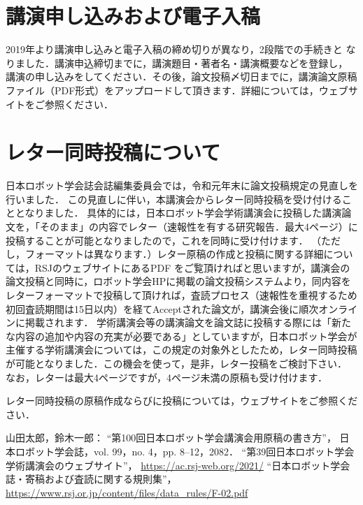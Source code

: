 \section{講演申し込みおよび電子入稿}
2019年より講演申し込みと電子入稿の締め切りが異なり，2段階での手続きと
なりました．講演申込締切までに，講演題目・著者名・講演概要などを登録し，
講演の申し込みをしてください．その後，論文投稿〆切日までに，講演論文原稿ファイル（PDF形式）をアップロードして頂きます．詳細については，ウェブサイトをご参照ください．

\section{レター同時投稿について}

日本ロボット学会誌会誌編集委員会では，令和元年末に論文投稿規定の見直しを行いました．
この見直しに伴い，本講演会からレター同時投稿を受け付けることとなりました．
具体的には，日本ロボット学会学術講演会に投稿した講演論文を，「そのまま」の内容でレター（速報性を有する研究報告．最大4ページ）に投稿することが可能となりましたので，これを同時に受け付けます．
（ただし，フォーマットは異なります．）レター原稿の作成と投稿に関する詳細については，RSJのウェブサイトにあるPDF\cite{rsj_rules}
をご覧頂ければと思いますが，講演会の論文投稿と同時に，ロボット学会HPに掲載の論文投稿システムより，同内容をレターフォーマットで投稿して頂ければ，査読プロセス（速報性を重視するため初回査読期間は15日以内）を経てAcceptされた論文が，講演会後に順次オンラインに掲載されます．
学術講演会等の講演論文を論文誌に投稿する際には「新たな内容の追加や内容の充実が必要である」としていますが，日本ロボット学会が主催する学術講演会については，この規定の対象外としたため，レター同時投稿が可能となりました．この機会を使って，是非，レター投稿をご検討下さい． なお，レターは最大4ページですが，4ページ未満の原稿も受け付けます． 

レター同時投稿の原稿作成ならびに投稿については，ウェブサイト\cite{website}をご参照ください．

    
\small
\begin{thebibliography}{9}

山田太郎，鈴木一郎：
``第100回日本ロボット学会講演会用原稿の書き方''，
日本ロボット学会誌，vol. 99，no. 4，pp. 8--12，2082．
``第39回日本ロボット学会学術講演会のウェブサイト''，
\url{https://ac.rsj-web.org/2021/}
``日本ロボット学会誌・寄稿および査読に関する規則集''，
\url{https://www.rsj.or.jp/content/files/data_rules/F-02.pdf}

\end{thebibliography}
\normalsize
